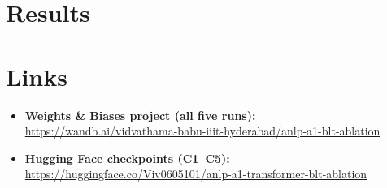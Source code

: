 \documentclass[12pt,a4paper]{article}
\begin{document}
\section{Results}
\label{sec:results}




\section*{Links}

\begin{itemize}\itemsep1pt
\item \textbf{Weights \& Biases project (all five runs):}\\
      \url{https://wandb.ai/vidvathama-babu-iiit-hyderabad/anlp-a1-blt-ablation}
\item \textbf{Hugging Face checkpoints (C1--C5):}\\
      \url{https://huggingface.co/Viv0605101/anlp-a1-transformer-blt-ablation}
\end{itemize}



\end{document}
